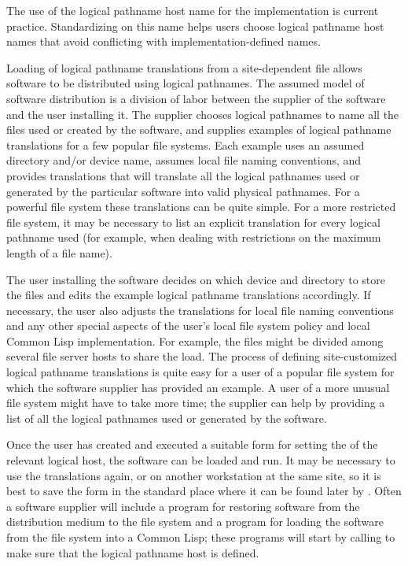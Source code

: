 
  The use of the logical pathname host name  for the implementation
  is current practice.  Standardizing on this name helps users choose
  logical pathname host names that avoid conflicting with
  implementation-defined names.


  Loading of logical pathname translations from a site-dependent file
  allows software to be distributed using logical pathnames.  The assumed
  model of software distribution is a division of labor between the
  supplier of the software and the user installing it.  The supplier
  chooses logical pathnames to name all the files used or created by the
  software, and supplies examples of logical pathname translations for a
  few popular file systems.  Each example uses an assumed directory and/or
  device name, assumes local file naming conventions, and provides
  translations that will translate all the logical pathnames used or
  generated by the particular software into valid physical pathnames.
  For a powerful file system these translations can be quite simple.  For
  a more restricted file system, it may be necessary to list an explicit
  translation for every logical pathname used (for example, when dealing
  with restrictions on the maximum length of a file name).


  The user installing the software decides on which device and directory
  to store the files and edits the example logical pathname translations
  accordingly.  If necessary, the user also adjusts the translations for
  local file naming conventions and any other special aspects of the user's
  local file system policy and local Common Lisp implementation.  For
  example, the files might be divided among several file server hosts to
  share the load.  The process of defining site-customized logical pathname
  translations is quite easy for a user of a popular file system for which
  the software supplier has provided an example.  A user of a more unusual
  file system might have to take more time; the supplier can help by
  providing a list of all the logical pathnames used or generated by the
  software.\strut

  Once the user has created and executed
  a suitable  form for setting the 
  of the relevant logical host, the software can be loaded and run.  It
  may be necessary to use the translations again, or on another workstation
  at the same site, so it is best to save the  form in the standard
  place where it can be found later by .
  Often a software supplier will include a program for restoring software
  from the distribution medium to the file system and a program for loading
  the software from the file system into a Common Lisp; these programs
  will start by calling  to make sure that
  the logical pathname host is defined.

